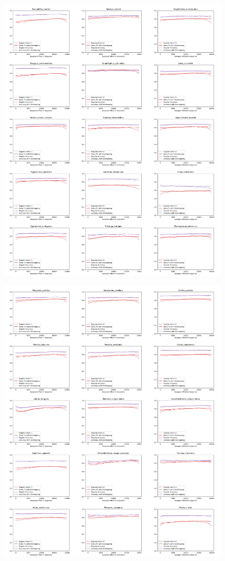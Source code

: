 \documentclass{article}
\begin{document}
\begin{figure}[!h]
\centerline{\includegraphics[width=1.2\textwidth]{images/overlapping/montage_animals11}}
\end{figure}
\begin{figure}[!h]
\centerline{\includegraphics[width=1.2\textwidth]{images/overlapping/montage_animals12}}
\end{figure}
\end{document}
